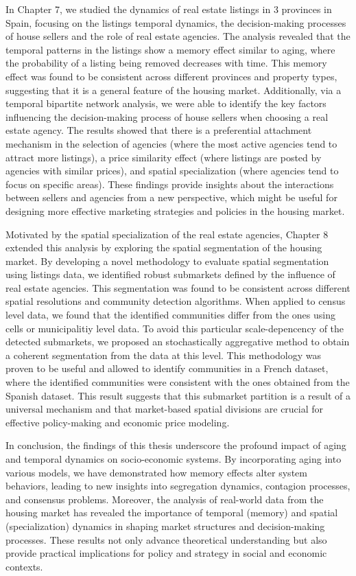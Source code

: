 In Chapter 7, we studied the dynamics of real estate listings in 3 provinces in Spain, focusing on the listings temporal dynamics, the decision-making processes of house sellers and the role of real estate agencies. The analysis revealed that the temporal patterns in the listings show a memory effect similar to aging, where the probability of a listing being removed decreases with time. This memory effect was found to be consistent across different provinces and property types, suggesting that it is a general feature of the housing market. Additionally, via a temporal bipartite network analysis, we were able to identify the key factors influencing the decision-making process of house sellers when choosing a real estate agency. The results showed that there is a preferential attachment mechanism in the selection of agencies (where the most active agencies tend to attract more listings), a price similarity effect (where listings are posted by agencies with similar prices), and spatial specialization (where agencies tend to focus on specific areas). These findings provide insights about the interactions between sellers and agencies from a new perspective, which might be useful for designing more effective marketing strategies and policies in the housing market.

Motivated by the spatial specialization of the real estate agencies, Chapter 8 extended this analysis by exploring the spatial segmentation of the housing market. By developing a novel methodology to evaluate spatial segmentation using listings data, we identified robust submarkets defined by the influence of real estate agencies. This segmentation was found to be consistent across different spatial resolutions and community detection algorithms. When applied to census level data, we found that the identified communities differ from the ones using cells or municipalitiy level data. To avoid this particular scale-depencency of the detected submarkets, we proposed an stochastically aggregative method to obtain a coherent segmentation from the data at this level. This methodology was proven to be useful and allowed to identify communities in a French dataset, where the identified communities were consistent with the ones obtained from the Spanish dataset. This result suggests that this submarket partition is a result of a universal mechanism and that market-based spatial divisions are crucial for effective policy-making and economic price modeling.

In conclusion, the findings of this thesis underscore the profound impact of aging and temporal dynamics on socio-economic systems. By incorporating aging into various models, we have demonstrated how memory effects alter system behaviors, leading to new insights into segregation dynamics, contagion processes, and consensus problems. Moreover, the analysis of real-world data from the housing market has revealed the importance of temporal (memory) and spatial (specialization) dynamics in shaping market structures and decision-making processes. These results not only advance theoretical understanding but also provide practical implications for policy and strategy in social and economic contexts.
